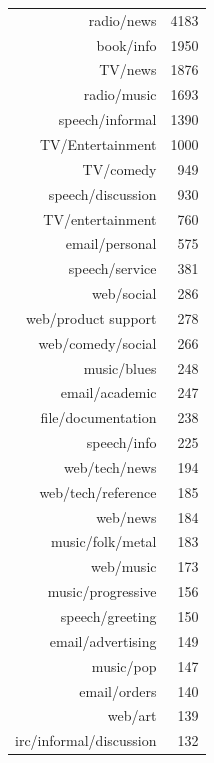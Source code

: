 \documentclass[xcolor=x11names,compress]{beamer}
\begin{document}
{\begin{columns}
        \begin{table}[ht]
            \centering
            \begin{tabular}{rr}
                radio/news & 4183 \\ 
                book/info & 1950 \\ 
                TV/news & 1876 \\ 
                radio/music & 1693 \\ 
                speech/informal & 1390 \\ 
                TV/Entertainment & 1000 \\ 
                TV/comedy &  949 \\ 
                speech/discussion &  930 \\ 
                TV/entertainment &  760 \\ 
                email/personal &  575 \\ 
                speech/service &  381 \\ 
                web/social &  286 \\ 
                web/product support &  278 \\ 
                web/comedy/social &  266 \\ 
                music/blues &  248 \\ 
                email/academic &  247 \\ 
                file/documentation &  238 \\ 
                speech/info &  225 \\ 
                web/tech/news &  194 \\ 
                web/tech/reference &  185 \\ 
                web/news &  184 \\ 
                music/folk/metal &  183 \\ 
                web/music &  173 \\ 
                music/progressive &  156 \\ 
                speech/greeting &  150 \\ 
                email/advertising &  149 \\ 
                music/pop &  147 \\ 
                email/orders &  140 \\ 
                web/art &  139 \\ 
                irc/informal/discussion &  132 \\ 

\end{tabular}
\end{table}
\end{columns}}
\end{document}
